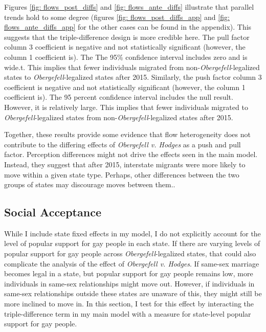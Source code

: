 \documentclass[12pt,letterpaper]{article}
\begin{document}
Figures \ref{fig: flows_post_diffs} and \ref{fig: flows_ante_diffs} illustrate that parallel trends hold to some degree (figures \ref{fig: flows_post_diffs_app} and \ref{fig: flows_ante_diffs_app} for the other cases can be found in the appendix). This suggests that the triple-difference design is more credible here. The pull factor column 3 coefficient is negative and not statistically significant (however, the column 1 coefficient is). The The 95\% confidence interval includes zero and is wide.t. This implies that fewer individuals migrated from non-\textit{Obergefell}-legalized states to \textit{Obergefell}-legalized states after 2015.  Similarly, the push factor column 3 coefficient is negative and not statistically significant (however, the column 1 coefficient is). The 95 percent confidence interval includes the null result. However, it is relatively large. This implies that fewer individuals migrated to \textit{Obergefell}-legalized states from non-\textit{Obergefell}-legalized states after 2015. 

Together, these results provide some evidence that flow heterogeneity does not contribute to the differing effects of \textit{Obergefell v. Hodges} as a push and pull factor. Perception differences might not drive the effects seen in the main model. Instead, they suggest that after 2015, interstate migrants were more likely to move within a given state type. Perhaps, other differences between the two groups of states may discourage moves between them..

\FloatBarrier
\subsection{Social Acceptance}

While I include state fixed effects in my model, I do not explicitly account for the level of popular support for gay people in each state. If there are varying levels of popular support for gay people across \textit{Obergefell}-legalized states, that could also complicate the analysis of the effect of \textit{Obergefell v. Hodges}. If same-sex marriage becomes legal in a state, but popular support for gay people remains low, more individuals in same-sex relationships might move out. However, if individuals in same-sex relationships outside these states are unaware of this, they might still be more inclined to move in. In this section, I test for this effect by interacting the triple-difference term in my main model with a measure for state-level popular support for gay people.
\end{document}
